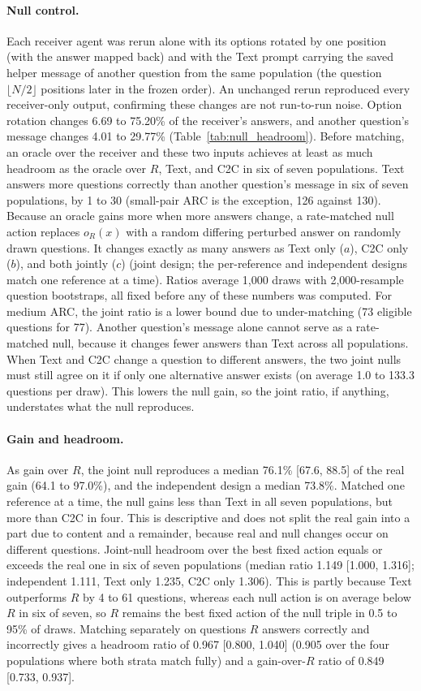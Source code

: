 \paragraph{Null control.} Each receiver agent was rerun alone with its options rotated by one position (with the answer mapped back) and with the Text prompt carrying the saved helper message of another question from the same population (the question $\lfloor N/2\rfloor$ positions later in the frozen order). An unchanged rerun reproduced every receiver-only output, confirming these changes are not run-to-run noise. Option rotation changes 6.69 to 75.20\% of the receiver's answers, and another question's message changes 4.01 to 29.77\% (Table~\ref{tab:null_headroom}). Before matching, an oracle over the receiver and these two inputs achieves at least as much headroom as the oracle over $R$, Text, and C2C in six of seven populations. Text answers more questions correctly than another question's message in six of seven populations, by 1 to 30 (small-pair ARC is the exception, 126 against 130). Because an oracle gains more when more answers change, a rate-matched null action replaces $o_R(x)$ with a random differing perturbed answer on randomly drawn questions. It changes exactly as many answers as Text only ($a$), C2C only ($b$), and both jointly ($c$) (joint design; the per-reference and independent designs match one reference at a time). Ratios average 1,000 draws with 2,000-resample question bootstraps, all fixed before any of these numbers was computed. For medium ARC, the joint ratio is a lower bound due to under-matching (73 eligible questions for 77). Another question's message alone cannot serve as a rate-matched null, because it changes fewer answers than Text across all populations. When Text and C2C change a question to different answers, the two joint nulls must still agree on it if only one alternative answer exists (on average 1.0 to 133.3 questions per draw). This lowers the null gain, so the joint ratio, if anything, understates what the null reproduces.

\paragraph{Gain and headroom.} As gain over $R$, the joint null reproduces a median 76.1\% [67.6, 88.5] of the real gain (64.1 to 97.0\%), and the independent design a median 73.8\%. Matched one reference at a time, the null gains less than Text in all seven populations, but more than C2C in four. This is descriptive and does not split the real gain into a part due to content and a remainder, because real and null changes occur on different questions. Joint-null headroom over the best fixed action equals or exceeds the real one in six of seven populations (median ratio 1.149 [1.000, 1.316]; independent 1.111, Text only 1.235, C2C only 1.306). This is partly because Text outperforms $R$ by 4 to 61 questions, whereas each null action is on average below $R$ in six of seven, so $R$ remains the best fixed action of the null triple in 0.5 to 95\% of draws. Matching separately on questions $R$ answers correctly and incorrectly gives a headroom ratio of 0.967 [0.800, 1.040] (0.905 over the four populations where both strata match fully) and a gain-over-$R$ ratio of 0.849 [0.733, 0.937].

